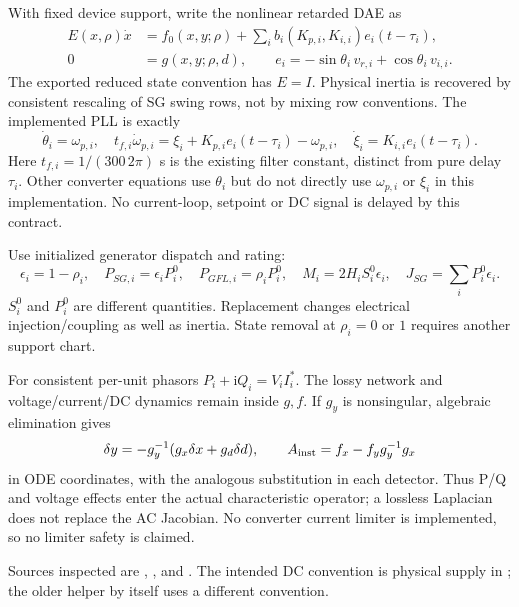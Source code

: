 \documentclass[11pt]{article}
\newcommand{\ii}{\mathrm{i}}
\begin{document}
With fixed device support, write the nonlinear retarded DAE as
\begin{align}
 E(x,\rho)\dot x&=f_0(x,y;\rho)+\sum_i b_i(K_{p,i},K_{i,i})e_i(t-\tau_i),\\
 0&=g(x,y;\rho,d),\qquad
 e_i=-\sin\theta_i\,v_{r,i}+\cos\theta_i\,v_{i,i}. \label{eq:dae}
\end{align}
The exported reduced state convention has $E=I$. Physical inertia is
recovered by consistent rescaling of SG swing rows, not by mixing row
conventions. The implemented PLL is exactly
\begin{equation}
 \dot\theta_i=\omega_{p,i},\quad
 t_{f,i}\dot\omega_{p,i}=\xi_i+K_{p,i}e_i(t-\tau_i)-\omega_{p,i},
 \quad \dot\xi_i=K_{i,i}e_i(t-\tau_i). \label{eq:pll}
\end{equation}
Here $t_{f,i}=1/(300\,2\pi)$ s is the existing filter constant, distinct
from pure delay $\tau_i$. Other converter equations use $\theta_i$ but
do not directly use $\omega_{p,i}$ or $\xi_i$ in this implementation.
No current-loop, setpoint or DC signal is delayed by this contract.

Use initialized generator dispatch and rating:
\[
 \epsilon_i=1-\rho_i,\quad P_{SG,i}=\epsilon_iP_i^0,\quad
 P_{GFL,i}=\rho_iP_i^0,\quad M_i=2H_iS_i^0\epsilon_i,\quad
 J_{SG}=\sum_iP_i^0\epsilon_i .
\]
$S_i^0$ and $P_i^0$ are different quantities. Replacement changes
electrical injection/coupling as well as inertia. State removal at
$\rho_i=0$ or $1$ requires another support chart.

For consistent per-unit phasors $P_i+\ii Q_i=V_iI_i^*$.
The lossy network and voltage/current/DC dynamics remain inside $g,f$.
If $g_y$ is nonsingular, algebraic elimination gives
\[
 \delta y=-g_y^{-1}(g_x\delta x+g_d\delta d),\qquad
 A_{\rm inst}=f_x-f_yg_y^{-1}g_x
\]
in ODE coordinates, with the analogous substitution in each detector.
Thus P/Q and voltage effects enter the actual characteristic operator;
a lossless Laplacian does not replace the AC Jacobian.
No converter current limiter is implemented, so no limiter safety is claimed.

Sources inspected are
,
, and
.
The intended DC convention is physical supply in ;
the older helper by itself uses a different convention.
\end{document}
